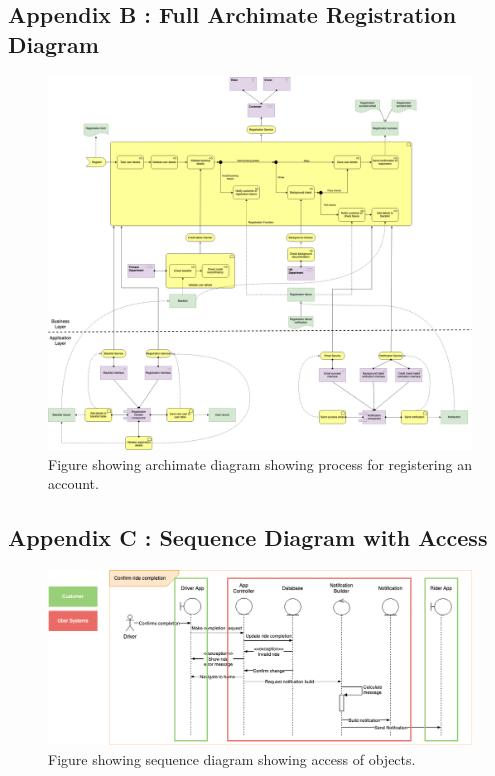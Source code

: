 \documentclass{article}
\begin{document}
    \subsection{Appendix B : Full Archimate Registration Diagram}
    \label{sec:AppendixB}
      \begin{figure}[H]
        \centering
        \captionsetup{justification=centering}
        \includegraphics[width=12cm]{assets/arch_full.drawio.png}
        \caption{Figure showing archimate diagram showing process for registering an account.}
        \label{fig:archimateProcessFull}
      \end{figure}

    \newpage
    \subsection{Appendix C : Sequence Diagram with Access}
      \begin{figure}[H]
        \centering
        \includegraphics[width=12cm]{assets/sequence_access.drawio.png}
        \caption{Figure showing sequence diagram showing access of objects.}
        \label{fig:sequenceWithSections}
      \end{figure}
\end{document}
